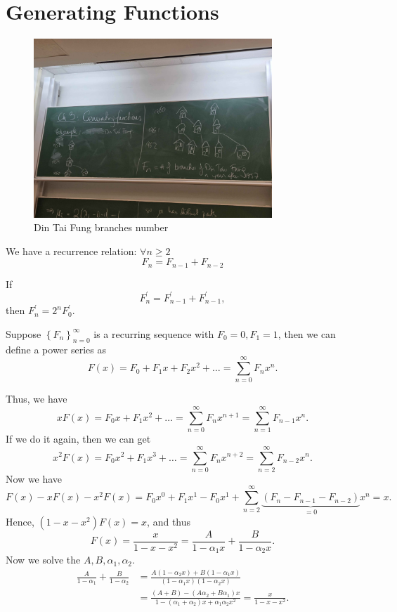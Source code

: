 \chapter{Generating Functions}
\begin{figure}[H]
    \centering
    \includegraphics[width=0.8\textwidth]{./Figures/20250923_165742.jpg}
    \caption{Din Tai Fung branches number}
    \label{fig: fibonacci from ding tai fung}
\end{figure}

We have a recurrence relation: \(\forall n \ge 2\)
\[
    F_n = F_{n - 1}+ F_{n -2}
\] 

\begin{eg}
    If 
    \[
        F_n ^{\prime}  = F_{n-1}^{\prime} + F_{n-1}^{\prime}, 
    \] then \(F_n^{\prime} = 2^n F_0^{\prime} \). 
\end{eg}

Suppose \(\left\{ F_n \right\}_{n=0}^{\infty}  \) is a recurring sequence with \(F_0 = 0, F_1 = 1\), then we can define a power series as 
\[
    F(x) = F_0 + F_1 x + F_2 x^2 + \dots = \sum_{n=0}^{\infty} F_n x^n. 
\] 

Thus, we have 
\[
    xF(x) = F_0 x + F_1 x^2 + \dots = \sum_{n=0}^{\infty} F_n x^{n + 1} = \sum_{n=1}^{\infty} F_{n-1} x^n.  
\]
If we do it again, then we can get 
\[
    x^2 F(x) = F_0 x^2 + F_1 x^3 + \dots = \sum_{n=0}^{\infty} F_n x^{n + 2} = \sum_{n=2}^{\infty} F_{n - 2} x^n.  
\]
Now we have 
\[
    F(x) - xF(x) - x^2 F(x) = F_0 x^0 + F_1 x^1 - F_0 x^1 + \sum_{n = 2}^{\infty} \underbrace{\left( F_n - F_{n - 1} - F_{n-2} \right)}_{=0} x^n = x. 
\]
Hence, \((1 - x - x^2) F(x) = x\), and thus 
\[
    F(x) = \frac{x}{1 - x - x^2} = \frac{A}{1 - \alpha _1 x} + \frac{B}{1 - \alpha _2 x}.
\] 
Now we solve the \(A, B, \alpha _1, \alpha _2\). 
\begin{align*}
    \frac{A}{1 - \alpha _1} + \frac{B}{1 - \alpha _2} &= \frac{A(1 - \alpha _2 x) + B(1 - \alpha _1 x)}{(1 - \alpha _1 x)(1 - \alpha _2 x)} \\
    &= \frac{(A + B) - (A \alpha _2 + B \alpha _1)x}{1 - (\alpha _1 + \alpha _2)x + \alpha _1 \alpha _2 x^2} = \frac{x}{1 - x - x^2}.
\end{align*} 


